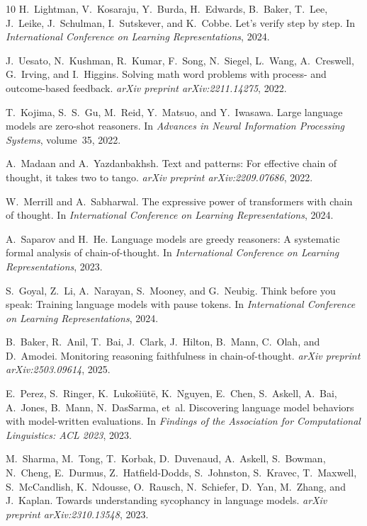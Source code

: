 \documentclass{article}
\theoremstyle{definition}
\theoremstyle{definition}
\begin{document}
\begin{thebibliography}{10}
H.~Lightman, V.~Kosaraju, Y.~Burda, H.~Edwards, B.~Baker, T.~Lee, J.~Leike,
  J.~Schulman, I.~Sutskever, and K.~Cobbe.
\newblock Let's verify step by step.
\newblock In \emph{International Conference on Learning Representations}, 2024.

J.~Uesato, N.~Kushman, R.~Kumar, F.~Song, N.~Siegel, L.~Wang, A.~Creswell,
  G.~Irving, and I.~Higgins.
\newblock Solving math word problems with process- and outcome-based feedback.
\newblock \emph{arXiv preprint arXiv:2211.14275}, 2022.

T.~Kojima, S.~S.~Gu, M.~Reid, Y.~Matsuo, and Y.~Iwasawa.
\newblock Large language models are zero-shot reasoners.
\newblock In \emph{Advances in Neural Information Processing Systems},
  volume~35, 2022.

A.~Madaan and A.~Yazdanbakhsh.
\newblock Text and patterns: For effective chain of thought, it takes two to
  tango.
\newblock \emph{arXiv preprint arXiv:2209.07686}, 2022.

W.~Merrill and A.~Sabharwal.
\newblock The expressive power of transformers with chain of thought.
\newblock In \emph{International Conference on Learning Representations}, 2024.

A.~Saparov and H.~He.
\newblock Language models are greedy reasoners: A systematic formal analysis of
  chain-of-thought.
\newblock In \emph{International Conference on Learning Representations}, 2023.

S.~Goyal, Z.~Li, A.~Narayan, S.~Mooney, and G.~Neubig.
\newblock Think before you speak: Training language models with pause tokens.
\newblock In \emph{International Conference on Learning Representations}, 2024.

B.~Baker, R.~Anil, T.~Bai, J.~Clark, J.~Hilton, B.~Mann,
  C.~Olah, and D.~Amodei.
\newblock Monitoring reasoning faithfulness in chain-of-thought.
\newblock \emph{arXiv preprint arXiv:2503.09614}, 2025.

E.~Perez, S.~Ringer, K.~Luko\v{s}i\={u}t\={e}, K.~Nguyen, E.~Chen,
  S.~Askell, A.~Bai, A.~Jones, B.~Mann, N.~DasSarma, et~al.
\newblock Discovering language model behaviors with model-written evaluations.
\newblock In \emph{Findings of the Association for Computational Linguistics:
  ACL 2023}, 2023.

M.~Sharma, M.~Tong, T.~Korbak, D.~Duvenaud, A.~Askell, S.~Bowman,
  N.~Cheng, E.~Durmus, Z.~Hatfield-Dodds, S.~Johnston, S.~Kravec,
  T.~Maxwell, S.~McCandlish, K.~Ndousse, O.~Rausch, N.~Schiefer,
  D.~Yan, M.~Zhang, and J.~Kaplan.
\newblock Towards understanding sycophancy in language models.
\newblock \emph{arXiv preprint arXiv:2310.13548}, 2023.

\end{thebibliography}
\end{document}

